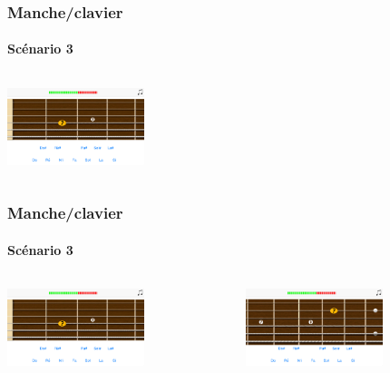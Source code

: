 \documentclass{beamer}
\begin{document}
	\begin{frame}

   		\frametitle{Manche/clavier}

       		\framesubtitle{Scénario 3}

		\begin{columns}

			 \begin{column}{0.4\textwidth}

				\includegraphics[width=4cm]{images/clavier_question.png}

			\end{column}

			 \begin{column}{0.4\textwidth}

				
			\end{column}

		\end{columns} 

	\end{frame}

	\begin{frame}

   		\frametitle{Manche/clavier}

       		\framesubtitle{Scénario 3}

		\begin{columns}

			 \begin{column}{0.4\textwidth}

				\includegraphics[width=4cm]{images/clavier_question.png}

			\end{column}

			 \begin{column}{0.4\textwidth}

				\includegraphics[width=4cm]{images/clavier_question_manche_decale.png}

				
			\end{column}


		\end{columns} 

	\end{frame}
\end{document}
